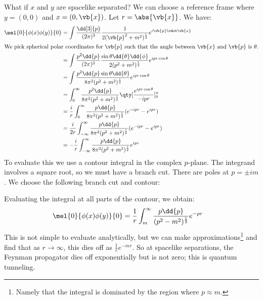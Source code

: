 \documentclass{jknotes} %
\begin{document}
What if \(x\) and \(y\) are spacelike separated? We can choose a reference frame where \(y=(0,0)\) and \(x=(0,\vb{x})\). Let \(r=\abs{\vb{x}}\). We have:
\begin{align}
    \mel{0}{\phi(x)\phi(y)}{0} &= \int\frac{\dd[3]{p}}{(2\pi)^3}\frac{1}{2(\vb{p}^2+m^2)^{\frac{1}{2}}}e^{i\vb{p}\vdot\vb{x}}\\
    \intertext{We pick spherical polar coordinates for \(\vb{p}\) such that the angle between \(\vb{x}\) and \(\vb{p}\) is \(\theta\).}
    &= \int \frac{p^2\dd{p}}{(2\pi)^3} \frac{\sin\theta\dd{\theta}\dd{\phi}}{2(p^2+m^2)^{\frac{1}{2}}}e^{ipr\cos\theta}\\
    &= \int \frac{p^2\dd{p}\sin\theta\dd{\theta}}{8\pi^2(p^2+m^2)^{\frac{1}{2}}}e^{ipr\cos\theta}\\
    &= \int_0^\infty \frac{p^2\dd{p}}{8\pi^2(p^2+m^2)^{\frac{1}{2}}}\qty[\frac{e^{ipr\cos\theta}}{-ipr}]_0^\pi \\
    &= \frac{i}{r} \int_0^\infty \frac{p\dd{p}}{8\pi^2(p^2+m^2)^{\frac{1}{2}}}(e^{-ipr}-e^{ipr}) \\
    &= \frac{i}{2r} \int_{-\infty}^\infty \frac{p\dd{p}}{8\pi^2(p^2+m^2)^{\frac{1}{2}}}(e^{-ipr}-e^{ipr}) \\
    &= -\frac{i}{r} \int_{-\infty}^\infty \frac{p\dd{p}}{8\pi^2(p^2+m^2)^{\frac{1}{2}}}e^{ipr}
\end{align}
To evaluate this we use a contour integral in the complex \(p\)-plane. The integrand involves a square root, so we must have a branch cut. There are poles at \(p=\pm im\). We choose the following branch cut and contour:
\begin{figure}[H]
    \centering
\end{figure}
Evaluating the integral at all parts of the contour, we obtain:
\begin{align}
    \mel{0}{\phi(x)\phi(y)}{0} &= \frac{1}{r}\int_m^\infty \frac{p\dd{p}}{(p^2-m^2)^{\frac{1}{2}}}e^{-pr}
\end{align}
This is not simple to evaluate analytically, but we can make approximations\footnote{Namely that the integral is dominated by the region where \(p \approx m\).} and find that as \(r\rightarrow\infty\), this dies off as \(\frac{1}{r}e^{-mr}\). So at spacelike separations, the Feynman propagator dies off exponentially but is not zero; this is quantum tunneling.
\end{document}
